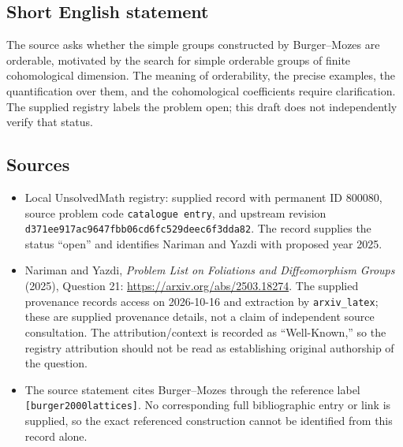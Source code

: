 \documentclass[11pt]{article}
\begin{document}
\subsection{Short English statement}
The source asks whether the simple groups constructed by Burger--Mozes are orderable, motivated by the search for simple orderable groups of finite cohomological dimension. The meaning of orderability, the precise examples, the quantification over them, and the cohomological coefficients require clarification. The supplied registry labels the problem open; this draft does not independently verify that status.
\subsection{Sources}
\begin{itemize}
\item Local UnsolvedMath registry: supplied record with permanent ID \(800080\), source problem code \texttt{catalogue entry}, and upstream revision \texttt{d371ee917ac9647fbb06cd6fc529deec6f3dda82}. The record supplies the status ``open'' and identifies Nariman and Yazdi with proposed year 2025.
\item Nariman and Yazdi, \emph{Problem List on Foliations and Diffeomorphism Groups} (2025), Question 21: \url{https://arxiv.org/abs/2503.18274}. The supplied provenance records access on 2026-10-16 and extraction by \texttt{arxiv\_latex}; these are supplied provenance details, not a claim of independent source consultation. The attribution/context is recorded as ``Well-Known,'' so the registry attribution should not be read as establishing original authorship of the question.
\item The source statement cites Burger--Mozes through the reference label \texttt{[burger2000lattices]}. No corresponding full bibliographic entry or link is supplied, so the exact referenced construction cannot be identified from this record alone.
\end{itemize}
\end{document}
